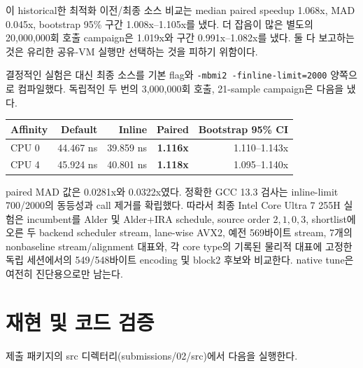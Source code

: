 \documentclass[11pt,a4paper]{article}
\begin{document}
이 historical한 최적화 이전/최종 소스 비교는 median paired speedup
1.068x, MAD 0.045x, bootstrap 95\% 구간 1.008x--1.105x를 냈다.  더
잡음이 많은 별도의 20,000,000회 호출 campaign은 1.019x와 구간
0.991x--1.082x를 냈다.  둘 다 보고하는 것은 유리한 공유-VM 실행만
선택하는 것을 피하기 위함이다.

결정적인 실험은 대신 최종 소스를 기본 flag와
\texttt{-mbmi2 -finline-limit=2000} 양쪽으로 컴파일했다.  독립적인
두 번의 3,000,000회 호출, 21-sample campaign은 다음을 냈다.

\begin{center}
\begin{tabular}{lrrrr}
\toprule
Affinity & Default & Inline & Paired & Bootstrap 95\% CI \\
\midrule
CPU 0 & 44.467 ns & 39.859 ns & \textbf{1.116x} & 1.110--1.143x \\
CPU 4 & 45.924 ns & 40.801 ns & \textbf{1.118x} & 1.095--1.140x \\
\bottomrule
\end{tabular}
\end{center}

paired MAD 값은 0.0281x와 0.0322x였다.  정확한 GCC 13.3 검사는
inline-limit 700/2000의 동등성과 call 제거를 확립했다.  따라서 최종
Intel Core Ultra 7 255H 실험은 incumbent를 Alder 및 Alder+IRA
schedule, source order $2,1,0,3$, shortlist에 오른 두 backend
scheduler stream, lane-wise AVX2, 예전 569바이트 stream, 7개의
nonbaseline stream/alignment 대표와, 각 core type의 기록된 물리적
대표에 고정한 독립 세션에서의 549/548바이트 encoding 및 block2
후보와 비교한다. native tune은 여전히 진단용으로만 남는다.

\section{재현 및 코드 검증}


제출 패키지의 src 디렉터리(submissions/02/src)에서 다음을 실행한다.
\end{document}

